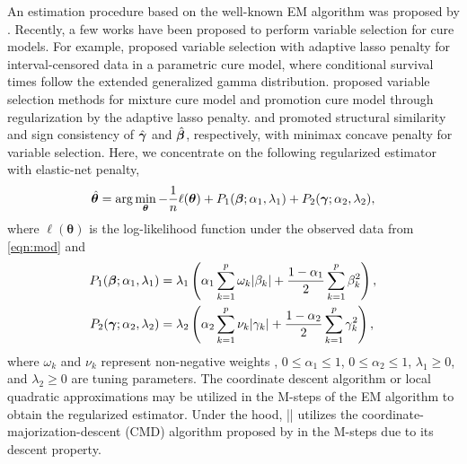An estimation procedure based on the well-known EM algorithm was
proposed by \citet{sy2000biometrics}. Recently, a few works have been
proposed to perform variable selection for cure models. For example,
\citet{scolas2016sim} proposed variable selection with adaptive lasso
penalty \citep{zou2006jasa} for interval-censored data in a parametric
cure model, where conditional survival times follow the extended
generalized gamma distribution. \citet{masud2018smimr} proposed variable
selection methods for mixture cure model and promotion cure model
through regularization by the adaptive lasso penalty.
\citet{fan2017smmr} and \citet{shi2019smmr} promoted structural
similarity and sign consistency of \(\hat{\bm{\gamma}}\) and \(\hat{\bm{\beta}}\),
respectively, with minimax concave penalty \citep{zhang2010aos} for
variable selection. Here, we concentrate on the following regularized
estimator with elastic-net penalty, \begin{align}
  \hat{\bm{\theta}} = \arg\min_{\bm{\theta}} -\frac{1}{n}
  \ell(\bm{\theta})
  + P_{1}(\bm{\beta}; \alpha_1, \lambda_1) + P_{2}(\bm{\gamma}; \alpha_2, \lambda_2),
\end{align} where \(\ell(\bm{\theta})\) is the log-likelihood function
under the observed data from \eqref{eqn:mod} and \begin{align*}
  P_{1}(\bm{\beta}; \alpha_1, \lambda_1)
  & = \lambda_1 \left( \alpha_1 \sum_{k=1}^{p} \omega_k \lvert \beta_k \rvert +
  \frac{1 - \alpha_1}{2} \sum_{k=1}^{p} \beta_k^2\right),\\
  P_{2}(\bm{\gamma}; \alpha_2, \lambda_2)
  & = \lambda_2 \left( \alpha_2 \sum_{k=1}^{p} \nu_k \lvert \gamma_k \rvert +
  \frac{1 - \alpha_2}{2} \sum_{k=1}^{p} \gamma_k^2 \right),
\end{align*} where \(\omega_k\) and \(\nu_k\) represent non-negative
weights \citep{zou2006jasa}, \(0\le\alpha_1\le1\), \(0\le\alpha_2\le1\),
\(\lambda_1\ge0\), and \(\lambda_2\ge0\) are tuning parameters. The
coordinate descent algorithm \citep{friedman2007aoas} or local quadratic
approximations \citep{fanLi2001jasa} may be utilized in the M-steps of
the EM algorithm to obtain the regularized estimator. Under the hood,
\VERB|\NormalTok{()}| utilizes the
coordinate-majorization-descent (CMD) algorithm proposed by
\citet{yang2013sii} in the M-steps due to its descent property.

